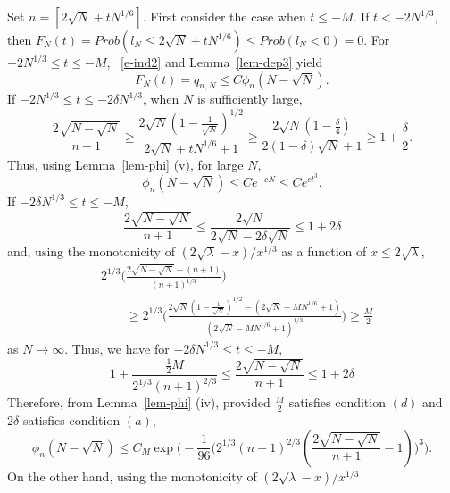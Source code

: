 \documentclass{amsart}
\theoremstyle{definition}
\theoremstyle{remark}
\numberwithin{equation}{section}
\begin{document}
Set $n=[2\sqrt{N}+tN^{1/6}]$.
First consider the case when $t\le -M$.
If $t<-2N^{1/3}$, then $F_N(t)=Prob (l_N\le 2\sqrt{N}+tN^{1/6})\le Prob (l_N<0)=
0$.
For $-2N^{1/3}\le t\le -M$,
~\eqref{e-ind2} and Lemma~\ref{lem-dep3} yield
\begin{equation}\label{e-mon3}
   F_N(t)=q_{n,N}\le C\phi_n(N-\sqrt{N}).
\end{equation}
If $-2N^{1/3}\le t\le -2\delta N^{1/3}$, when $N$ is sufficiently large,
\begin{equation*}
   \frac{2\sqrt{N-\sqrt{N}}}{n+1} \geq
\frac{2\sqrt{N}(1-\frac1{\sqrt{N}})^{1/2}}{2\sqrt{N}+tN^{1/6}+1}
\geq \frac{2\sqrt{N}(1-\frac{\delta}4)}{2(1-\delta)\sqrt{N}+1}
\geq 1+\frac{\delta}2.
\end{equation*}
Thus, using Lemma~\ref{lem-phi} (v), for large $N$, 
\begin{equation}\label{e-z43}
   \phi_n(N-\sqrt{N})\le Ce^{-cN}\le Ce^{ct^3}.
\end{equation}
If $-2\delta N^{1/3}\le t\le -M$,
\begin{equation*}\label{e-mon4}
   \frac{2\sqrt{N-\sqrt{N}}}{n+1} \le
\frac{2\sqrt{N}}{2\sqrt{N}-2\delta\sqrt{N}}\le 1+2\delta
\end{equation*}
and, using the monotonicity of $(2\sqrt{\lambda}-x)/x^{1/3}$
as a function of $x\le 2\sqrt{\lambda}$,
\begin{equation*}\label{e-mon5}
\begin{split}
    & 2^{1/3}\biggl(\frac{2\sqrt{N-\sqrt{N}}-(n+1)}{(n+1)^{1/3}}\biggr)\\
    &\qquad\geq 2^{1/3}\biggl(\frac{2\sqrt{N}
(1-\frac1{\sqrt{N}})^{1/2}-(2\sqrt{N}-MN^{1/6}+1)}
{(2\sqrt{N}-MN^{1/6}+1)^{1/3}}\biggr) \geq \frac{M}2
\end{split}
\end{equation*}
as $N\to\infty$.
Thus, we have for $-2\delta N^{1/3}\le t\le -M$,
\begin{equation*}\label{e-mon6}
   1+\frac{\frac12M}{2^{1/3}{(n+1)}^{2/3}} \le \frac{2\sqrt{N-\sqrt{N}}}{n+1}
\le 1+2\delta
\end{equation*}
Therefore, from Lemma~\ref{lem-phi} (iv), provided $\frac{M}2$ satisfies 
condition $(d)$ and $2\delta$ satisfies condition $(a)$, 
\begin{equation}\label{e-mon7}
   \phi_n(N-\sqrt{N})\le C_M
\exp\biggl(-\frac1{96}\bigl(2^{1/3}(n+1)^{2/3}
(\frac{2\sqrt{N-\sqrt{N}}}{n+1}-1)\bigr)^3 \biggr).
\end{equation}
On the other hand,
using the monotonicity of $(2\sqrt{\lambda}-x)/x^{1/3}$
\end{document}
